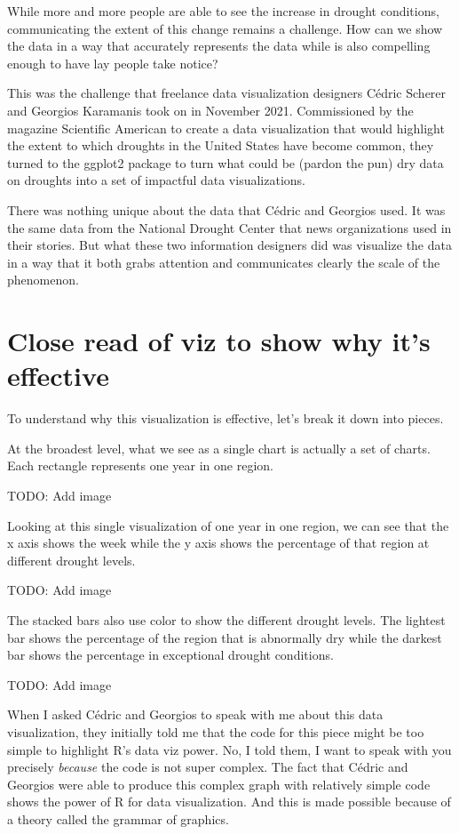 \documentclass[
]{book}
\begin{document}
While more and more people are able to see the increase in drought conditions, communicating the extent of this change remains a challenge. How can we show the data in a way that accurately represents the data while is also compelling enough to have lay people take notice?

This was the challenge that freelance data visualization designers Cédric Scherer and Georgios Karamanis took on in November 2021. Commissioned by the magazine Scientific American to create a data visualization that would highlight the extent to which droughts in the United States have become common, they turned to the ggplot2 package to turn what could be (pardon the pun) dry data on droughts into a set of impactful data visualizations.

There was nothing unique about the data that Cédric and Georgios used. It was the same data from the National Drought Center that news organizations used in their stories. But what these two information designers did was visualize the data in a way that it both grabs attention and communicates clearly the scale of the phenomenon.

\hypertarget{close-read-of-viz-to-show-why-its-effective}{%
\section{Close read of viz to show why it's effective}\label{close-read-of-viz-to-show-why-its-effective}}

To understand why this visualization is effective, let's break it down into pieces.

At the broadest level, what we see as a single chart is actually a set of charts. Each rectangle represents one year in one region.

TODO: Add image

Looking at this single visualization of one year in one region, we can see that the x axis shows the week while the y axis shows the percentage of that region at different drought levels.

TODO: Add image

The stacked bars also use color to show the different drought levels. The lightest bar shows the percentage of the region that is abnormally dry while the darkest bar shows the percentage in exceptional drought conditions.

TODO: Add image

When I asked Cédric and Georgios to speak with me about this data visualization, they initially told me that the code for this piece might be too simple to highlight R's data viz power. No, I told them, I want to speak with you precisely \emph{because} the code is not super complex. The fact that Cédric and Georgios were able to produce this complex graph with relatively simple code shows the power of R for data visualization. And this is made possible because of a theory called the grammar of graphics.
\end{document}
